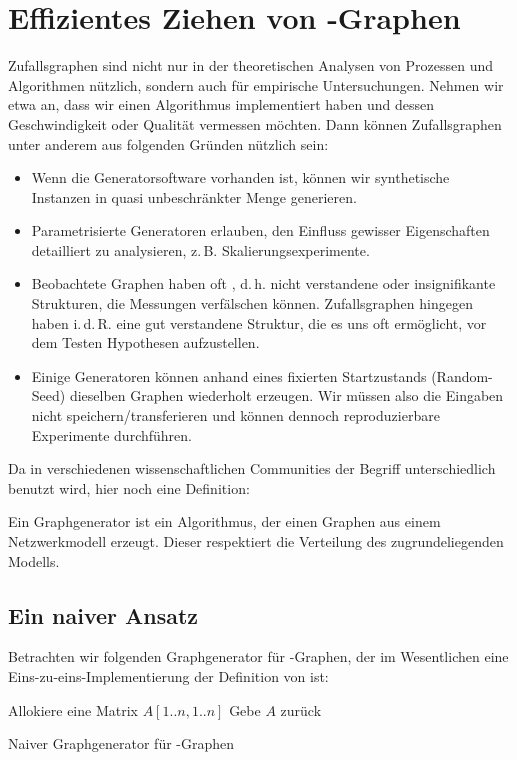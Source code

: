 \section{Effizientes Ziehen von \Gnp-Graphen}
Zufallsgraphen sind nicht nur in der theoretischen Analysen von Prozessen und Algorithmen nützlich, sondern auch für empirische Untersuchungen.
Nehmen wir etwa an, dass wir einen Algorithmus implementiert haben und dessen Geschwindigkeit oder Qualität vermessen möchten.
Dann können Zufallsgraphen unter anderem aus folgenden Gründen nützlich sein:
\begin{itemize}
    \item Wenn die Generatorsoftware vorhanden ist, können wir synthetische Instanzen in quasi unbeschränkter Menge generieren.
    \item Parametrisierte Generatoren erlauben, den Einfluss gewisser Eigenschaften detailliert zu analysieren, z.\,B. Skalierungsexperimente.
    \item Beobachtete Graphen haben oft , d.\,h. nicht verstandene oder insignifikante Strukturen, die Messungen verfälschen können.
          Zufallsgraphen hingegen haben i.\,d.\,R. eine gut verstandene Struktur, die es uns oft ermöglicht, vor dem Testen Hypothesen aufzustellen.
    \item Einige Generatoren können anhand eines fixierten Startzustands (Random-Seed) dieselben Graphen wiederholt erzeugen.
          Wir müssen also die Eingaben nicht speichern/transferieren und können dennoch reproduzierbare Experimente durchführen.
\end{itemize}

\noindent Da in verschiedenen wissenschaftlichen Communities der Begriff  unterschiedlich benutzt wird, hier noch eine Definition:
\begin{definition}
    Ein  Graphgenerator ist ein Algorithmus, der einen Graphen aus einem Netzwerkmodell erzeugt.
    Dieser respektiert die Verteilung des zugrundeliegenden Modells.
\end{definition}

\subsection{Ein naiver Ansatz}
Betrachten wir folgenden Graphgenerator für \Gnp-Graphen, der im Wesentlichen eine Eins-zu-eins-Implementierung der Definition von \Gnp ist:

\begin{algorithm}[H]
    Allokiere eine Matrix $A[1..n, 1..n]$\;
    Gebe $A$ zurück
    \caption{Naiver Graphgenerator für \Gnp-Graphen}
    \label{alg:naive-gnp}
\end{algorithm}

